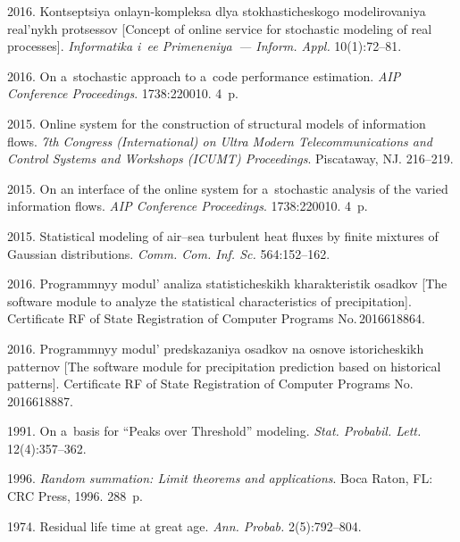 \begin{multicols}{2}
{{\begin{thebibliography}{99}
 2016. Kontseptsiya onlayn-kompleksa dlya stokhasticheskogo 
modelirovaniya real'nykh pro\-tses\-sov [Concept of online service for stochastic 
modeling of real processes]. \textit{Informatika i~ee Primeneniya~--- Inform. Appl.} 
10(1):72--81.

 2016. On a~stochastic approach to 
a~code performance estimation. \textit{AIP Conference Proceedings}. 1738:220010. 4~p.

 2015. Online system for the construction of
structural models of information flows. \textit{7th 
 Congress (International) on Ultra Modern Telecommunications and Control Systems 
and Workshops (ICUMT) Proceedings}. Piscataway, NJ. 216--219.

 2015. On an interface of the online system 
for a~stochastic analysis of the varied information flows. 
\textit{AIP Conference Proceedings}. 1738:220010. 4~p.

 2015. 
Statistical modeling of air--sea turbulent heat fluxes by finite mixtures 
of Gaussian distributions. \textit{Comm. Com. Inf. Sc.} 564:152--162.

 2016.  Programmnyy modul' ana\-li\-za statisticheskikh 
kharakteristik osadkov [The software module to analyze the statistical 
characteristics of precipitation]. Certificate RF of State Registration 
of Computer Programs No.\,2016618864.

 2016. Programmnyy modul' predskazaniya 
osadkov na osnove istoricheskikh patternov  [The software module for precipitation 
prediction based on historical patterns]. Certificate RF of State Registration of 
Computer Programs No.\,2016618887.

 1991. On a~basis for ``Peaks over Threshold'' modeling. 
\textit{Stat. Probabil. Lett.} 12(4):357--362.

 1996. 
\textit{Random summation: Limit theorems and applications}. Boca Raton, FL: 
CRC Press, 1996. 288~p.

 1974. Residual life time at great age. 
\textit{Ann. Probab.} 2(5):792--804.


\end{thebibliography}}}
\end{multicols}
